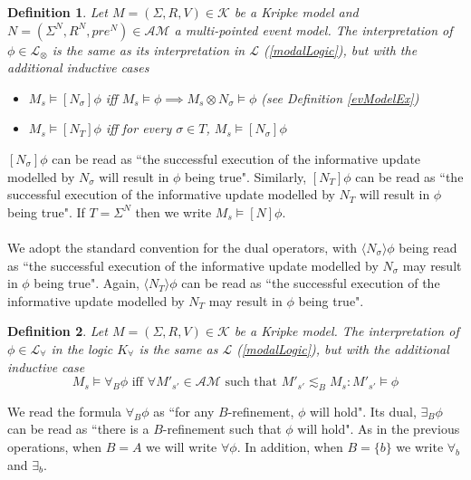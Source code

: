 \documentclass[12pt, a4paper, titlepage]{article}
\newtheorem{defn}{Definition}[subsection]
\numberwithin{equation}{section}
\newcommand{\sqex}[1]{[{#1}]}
\newcommand{\anex}[1]{\langle {#1} \rangle}
\newcommand{\lang}{\mathcal{L}}
\newcommand{\langRefine}{\lang_{\forall}}
\newcommand{\langActEx}{\lang_{\otimes}}
\newcommand{\kripkeClass}{\mathcal{K}}
\newcommand{\eventClass}{\mathcal{AM}}
\newcommand{\FIXME}{{\bf FIXME}}
\begin{document}
\begin{defn} \label{actModelLogic}
Let $M = (\Sigma, R, V) \in \kripkeClass$ be a Kripke model and $N = (\Sigma^N, R^N, pre^N) \in
\eventClass$ a multi-pointed event model.
The interpretation of $\phi \in \langActEx$ is the same as its interpretation in $\lang$
(\ref{modalLogic}), but with the additional
inductive cases
\begin{itemize}
	\item $M_s \models \sqex{N_\sigma} \phi$ iff $M_s \models \phi \implies M_s \otimes N_\sigma \models
	\phi$ (see Definition \ref{evModelEx})
	\item $M_s \models \sqex{N_T} \phi$ iff for every $\sigma \in T$, $M_s \models \sqex{N_\sigma} \phi$ 
\end{itemize}
\end{defn}
$\sqex{N_\sigma} \phi$ can be read as ``the successful execution of the informative update modelled by
$N_\sigma$ will result in $\phi$ being true".
Similarly, $\sqex{N_T} \phi$ can be read as ``the successful execution of the informative update
modelled by $N_T$ will result in $\phi$ being true".
If $T = \Sigma^N$ then we write $M_s \models \sqex{N} \phi$.\\
\\
We adopt the standard convention for the dual operators, with $\anex{ N_\sigma } \phi$ being
read as ``the successful execution of the informative update modelled by $N_\sigma$ may result in
$\phi$ being true".
Again, $\anex{ N_T } \phi$ can be read as ``the successful execution of the informative
update modelled by $N_T$ may result in $\phi$ being true".


\begin{defn} \label{refineLogic}
Let $M = (\Sigma, R, V) \in \kripkeClass$ be a Kripke model.
The interpretation of $\phi \in \langRefine$ in the logic $K_\forall$ is the same as $\lang$
(\ref{modalLogic}), but with the additional inductive case
\[
	M_s \models \forall_B \phi \text{ iff } \forall M'_{s'} \in \eventClass \text{ such that } M'_{s'}
	\lesssim_B M_s : M'_{s'} \models \phi
\]
\end{defn}
We read the formula $\forall_B \phi$ as ``for any $B$-refinement, $\phi$ will hold".
Its dual, $\exists_B \phi$ can be read as ``there is a $B$-refinement such that $\phi$ will hold".
As in the previous operations, when $B = A$ we will write $\forall \phi$.
In addition, when $B = \{b\}$ we write $\forall_b$ and $\exists_b$.
\end{document}
